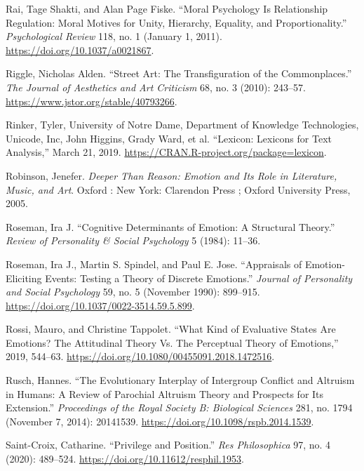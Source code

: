 \documentclass[phdthesis,12pt,final]{wuthesis}
\newlength{\cslhangindent}
\newenvironment{CSLReferences}[2] %
{\begin{list}{}{%
	\setlength{\itemindent}{0pt}
	\setlength{\leftmargin}{0pt}
	\setlength{\parsep}{0pt}
	\ifodd #1
	\setlength{\leftmargin}{\cslhangindent}
	\setlength{\itemindent}{-1\cslhangindent}
	\fi
	\setlength{\itemsep}{#2\baselineskip}}}
{\end{list}}
\theoremstyle{definition}
\theoremstyle{definition}
\theoremstyle{definition}
\theoremstyle{definition}
\theoremstyle{remark}
\begin{document}
\begin{CSLReferences}{1}{0}
Rai, Tage Shakti, and Alan Page Fiske. {``Moral Psychology Is Relationship Regulation: Moral Motives for Unity, Hierarchy, Equality, and Proportionality.''} \emph{Psychological Review} 118, no. 1 (January 1, 2011). \url{https://doi.org/10.1037/a0021867}.

Riggle, Nicholas Alden. {``Street {Art}: {The Transfiguration} of the {Commonplaces}.''} \emph{The Journal of Aesthetics and Art Criticism} 68, no. 3 (2010): 243--57. \url{https://www.jstor.org/stable/40793266}.

Rinker, Tyler, University of Notre Dame, Department of Knowledge Technologies, Unicode, Inc, John Higgins, Grady Ward, et al. {``Lexicon: {Lexicons} for {Text Analysis},''} March 21, 2019. \url{https://CRAN.R-project.org/package=lexicon}.

Robinson, Jenefer. \emph{Deeper Than Reason: Emotion and Its Role in Literature, Music, and Art}. Oxford : New York: Clarendon Press ; Oxford University Press, 2005.

Roseman, Ira J. {``Cognitive Determinants of Emotion: {A} Structural Theory.''} \emph{Review of Personality \& Social Psychology} 5 (1984): 11--36.

Roseman, Ira J., Martin S. Spindel, and Paul E. Jose. {``Appraisals of Emotion-Eliciting Events: {Testing} a Theory of Discrete Emotions.''} \emph{Journal of Personality and Social Psychology} 59, no. 5 (November 1990): 899--915. \url{https://doi.org/10.1037/0022-3514.59.5.899}.

Rossi, Mauro, and Christine Tappolet. {``What {Kind} of {Evaluative States Are Emotions}? {The Attitudinal Theory Vs}. {The Perceptual Theory} of {Emotions},''} 2019, 544--63. \url{https://doi.org/10.1080/00455091.2018.1472516}.

Rusch, Hannes. {``The Evolutionary Interplay of Intergroup Conflict and Altruism in Humans: A Review of Parochial Altruism Theory and Prospects for Its Extension.''} \emph{Proceedings of the Royal Society B: Biological Sciences} 281, no. 1794 (November 7, 2014): 20141539. \url{https://doi.org/10.1098/rspb.2014.1539}.

Saint-Croix, Catharine. {``Privilege and {Position}.''} \emph{Res Philosophica} 97, no. 4 (2020): 489--524. \url{https://doi.org/10.11612/resphil.1953}.


\end{CSLReferences}
\end{document}
